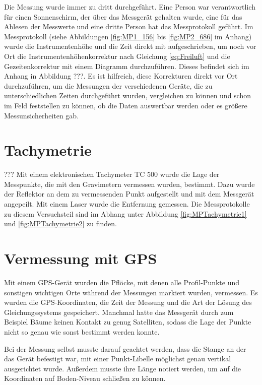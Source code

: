 Die Messung wurde immer zu dritt durchgeführt. Eine Person war verantwortlich für einen Sonnenschirm, der über das Messgerät gehalten wurde, eine für das Ablesen der Messwerte 
und eine dritte Person hat das Messprotokoll geführt. Im Messprotokoll (siehe Abbildungen \ref{fig:MP1_156} bis \ref{fig:MP2_686} im Anhang) wurde die Instrumentenhöhe und die Zeit direkt mit aufgeschrieben, um noch vor Ort die Instrumentenhöhenkorrektur nach Gleichung \eqref{eq:Freiluft} und die Gezeitenkorrektur mit einem Diagramm durchzuführen. Dieses befindet sich im Anhang in Abbildung ???. Es ist hilfreich, diese Korrekturen direkt vor Ort durchzuführen, um die Messungen der verschiedenen Geräte, die zu unterschiedlichen Zeiten durchgeführt wurden, vergleichen zu können und schon im Feld feststellen zu können, ob die Daten auswertbar werden oder es größere Messunsicherheiten gab.

\section{Tachymetrie}???
Mit einem elektronischen Tachymeter TC 500 wurde die Lage der Messpunkte, die mit den Gravimetern vermessen wurden, bestimmt. Dazu wurde der Reflektor an dem zu vermessenden Punkt aufgestellt und mit dem Messgerät angepeilt. Mit einem Laser wurde die Entfernung gemessen. Die Messprotokolle zu diesem Versuchsteil sind im Abhang unter Abbildung \ref{fig:MPTachymetrie1} und \ref{fig:MPTachymetrie2} zu finden.

\section{Vermessung mit GPS}

Mit einem GPS-Gerät wurden die Pflöcke, mit denen alle Profil-Punkte und sonstigen wichtigen Orte während der Messungen markiert wurden, vermessen. Es wurden die GPS-Koordinaten, die Zeit der Messung und die Art der Lösung des Gleichungssystems gespeichert. Manchmal hatte das Messgerät durch zum Beispiel Bäume keinen Kontakt zu genug Satelliten, sodass die Lage der Punkte nicht so genau wie sonst bestimmt werden konnte.

Bei der Messung selbst musste darauf geachtet werden, dass die Stange an der das Gerät befestigt war, mit einer Punkt-Libelle möglichst genau vertikal ausgerichtet wurde. Außerdem musste ihre Länge notiert werden, um auf die Koordinaten auf Boden-Niveau schließen zu können.